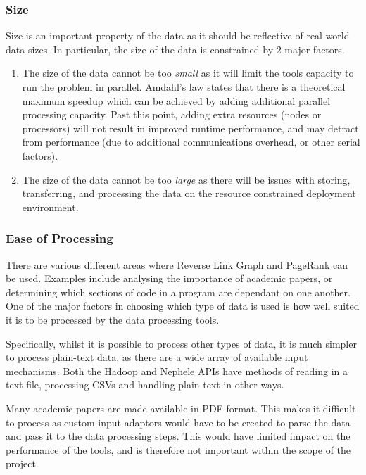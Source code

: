 \subsubsection{Size}
Size is an important property of the data as it should be reflective of real-world data sizes. In particular, the size of the data is constrained by 2 major factors.

\begin{enumerate}
	\item The size of the data cannot be too \textit{small} as it will limit the tools capacity to run the problem in parallel. Amdahl's law \cite{amdahl1967validity} states that there is a theoretical maximum speedup which can be achieved by adding additional parallel processing capacity. Past this point, adding extra resources (nodes or processors) will not result in improved runtime performance, and may detract from performance (due to additional communications overhead, or other serial factors).
	\item The size of the data cannot be too \textit{large} as there will be issues with storing, transferring, and processing the data on the resource constrained deployment environment.
\end{enumerate}

\subsubsection{Ease of Processing}
There are various different areas where Reverse Link Graph and PageRank can be used. Examples include analysing the importance of academic papers, or determining which sections of code in a program are dependant on one another. One of the major factors in choosing which type of data is used is how well suited it is to be processed by the data processing tools. 

Specifically, whilst it is possible to process other types of data, it is much simpler to process plain-text data, as there are a wide array of available input mechanisms. Both the Hadoop and Nephele APIs have methods of reading in a text file, processing CSVs and handling plain text in other ways. 

Many academic papers are made available in PDF format. This makes it difficult to process as custom input adaptors would have to be created to parse the data and pass it to the data processing steps. This would have limited impact on the performance of the tools, and is therefore not important within the scope of the project. 

